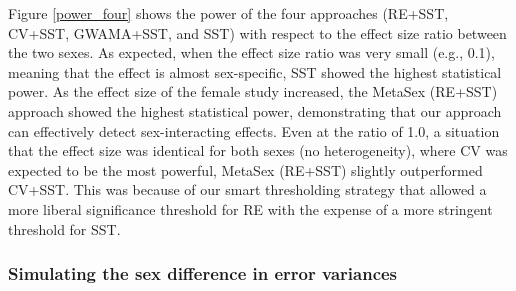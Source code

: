 \documentclass[11pt]{article}
\begin{document}
%
%
Figure \ref{power_four} shows the power of the four approaches 
(RE+SST, CV+SST,
GWAMA+SST, and SST) with respect to the effect size ratio between the two sexes.
%
As expected, when the effect size ratio was very small (e.g., 0.1), meaning 
that the effect is almost sex-specific,
SST showed the highest statistical power. 
As the effect size of the female study increased, the MetaSex (RE+SST) approach showed the highest statistical power,
demonstrating that our approach can effectively detect sex-interacting effects.
%
Even at the ratio of 1.0, a situation that the effect size was identical for both sexes (no heterogeneity),
where CV was expected to be the most powerful,
MetaSex (RE+SST) slightly outperformed CV+SST. 
This was because of our smart thresholding strategy that allowed a more liberal significance threshold for RE
with the expense of 
a more stringent threshold for SST.

\subsubsection*{Simulating the sex difference in error variances}
\end{document}
